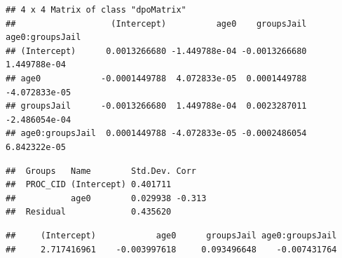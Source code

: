 \begin{frame}[fragile]

\small

\begin{Shaded}
\begin{Highlighting}[]
\end{Highlighting}
\end{Shaded}

\begin{verbatim}
## 4 x 4 Matrix of class "dpoMatrix"
##                   (Intercept)          age0    groupsJail age0:groupsJail
## (Intercept)      0.0013266680 -1.449788e-04 -0.0013266680    1.449788e-04
## age0            -0.0001449788  4.072833e-05  0.0001449788   -4.072833e-05
## groupsJail      -0.0013266680  1.449788e-04  0.0023287011   -2.486054e-04
## age0:groupsJail  0.0001449788 -4.072833e-05 -0.0002486054    6.842322e-05
\end{verbatim}

\end{frame}

\begin{frame}[fragile]

\small

\begin{Shaded}
\begin{Highlighting}[]
\end{Highlighting}
\end{Shaded}

\begin{verbatim}
##  Groups   Name        Std.Dev. Corr  
##  PROC_CID (Intercept) 0.401711       
##           age0        0.029938 -0.313
##  Residual             0.435620
\end{verbatim}

\end{frame}

\begin{frame}[fragile]

\small

\begin{Shaded}
\begin{Highlighting}[]
\end{Highlighting}
\end{Shaded}

\begin{verbatim}
##     (Intercept)            age0      groupsJail age0:groupsJail 
##     2.717416961    -0.003997618     0.093496648    -0.007431764
\end{verbatim}

\end{frame}

